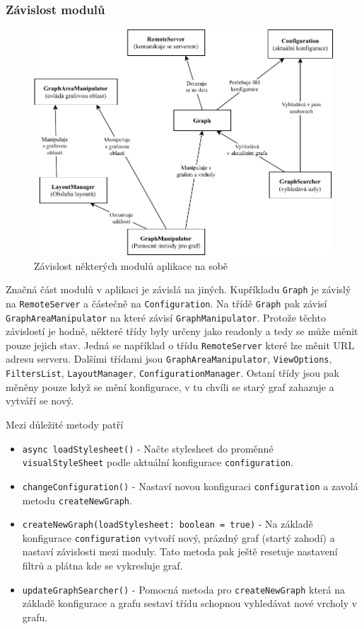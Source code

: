 \subsubsection{Závislost modulů}

\begin{figure}
    \centering
    \includegraphics[width=\textwidth]{media/dependencies.pdf}
    \caption{Závislost některých modulů aplikace na sobě}
\end{figure}

Značná část modulů v aplikaci je závislá na jiných. Kupříkladu \texttt{Graph} je závislý na \texttt{RemoteServer} a částečně na \texttt{Configuration}. Na třídě \texttt{Graph} pak závisí \texttt{GraphAreaManipulator} na které závisí \texttt{GraphManipulator}. Protože těchto závislostí je hodně, některé třídy byly určeny jako readonly a tedy se může měnit pouze jejich stav. Jedná se například o třídu \texttt{RemoteServer} které lze měnit URL adresu serveru. Dalšími třídami jsou \texttt{GraphAreaManipulator}, \texttt{ViewOptions}, \texttt{FiltersList}, \texttt{LayoutManager}, \texttt{ConfigurationManager}. Ostaní třídy jsou pak měněny pouze když se mění konfigurace, v tu chvíli se starý graf zahazuje a vytváří se nový.

\medskip

Mezi důležité metody patří
\begin{itemize}
  \item \texttt{async loadStylesheet()} - Načte stylesheet do proměnné \\ \texttt{visualStyleSheet} podle aktuální konfigurace \texttt{configuration}.
  \item \texttt{changeConfiguration()} - Nastaví novou konfiguraci \texttt{configuration} a zavolá metodu \texttt{createNewGraph}.
  \item \texttt{createNewGraph(loadStylesheet: boolean = true)} - Na základě konfigurace \texttt{configuration} vytvoří nový, prázdný graf (startý zahodí) a nastaví závislosti mezi moduly. Tato metoda pak ještě resetuje nastavení filtrů a plátna kde se vykresluje graf.
  \item \texttt{updateGraphSearcher()} - Pomocná metoda pro \texttt{createNewGraph} která na základě konfigurace a grafu sestaví třídu schopnou vyhledávat nové vrcholy v grafu.
\end{itemize}

